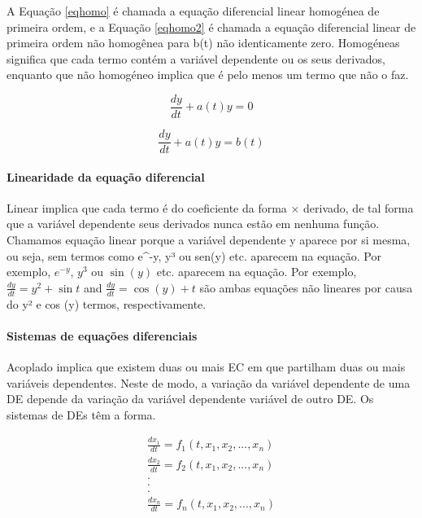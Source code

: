 \documentclass[11pt, letterpaper, portuguese]{article}
\begin{document}
    \par{A Equação \ref{eqhomo} é chamada a equação diferencial linear homogénea de primeira ordem, e a Equação \ref{eqhomo2} é chamada a equação diferencial linear de primeira ordem não homogênea para b(t) não identicamente zero. Homogéneas
significa que cada termo contém a variável dependente ou os seus derivados, enquanto que não homogéneo implica que é pelo menos um termo que não o faz.
}
    
    \begin{equation}
        \frac{d y}{d t}+a(t) y =0
        \label{eqhomo}
    \end{equation}
    
    \begin{equation}
        \frac{d y}{d t}+a(t) y =b(t)
        \label{eqhomo2}
    \end{equation}

    
    \paragraph{Linearidade da equação diferencial}
    
    \par{Linear implica que cada termo é do coeficiente da forma × derivado, de tal forma que a variável dependente seus derivados nunca estão em nenhuma função. Chamamos equação linear porque a variável dependente y aparece por si mesma, ou seja, sem termos como e^-y, y³ ou sen(y) etc. aparecem na equação. Por exemplo, $e^{-y}$, $y^3$ ou $\sin{(y)}$ etc. aparecem na equação. Por exemplo, $\frac{dy}{dt} = y^2 + \sin{t}$ and $\frac{dy}{dt} = \cos{(y)} + t$ são ambas equações não lineares por causa do y² e cos (y) termos, respectivamente. \cite{braun_1993}}

    \paragraph{Sistemas de equações diferenciais}
    
    \par{Acoplado implica que existem duas ou mais EC em que partilham duas ou mais variáveis dependentes. Neste de modo, a variação da variável dependente de uma DE depende da variação da variável dependente variável de outro DE. Os sistemas de DEs têm a forma.}

    \begin{equation}
    \begin{split}
    \frac{d x_1}{dt}=f_1(t,x_1,x_2,...,x_n)\\
    \frac{d x_2}{dt}=f_2(t,x_1,x_2,...,x_n)\\
    . \\
    . \\
    . \\ 
    \frac{d x_n}{dt}=f_n(t,x_1,x_2,...,x_n)
    \end{split}
    \end{equation}
\end{document}

